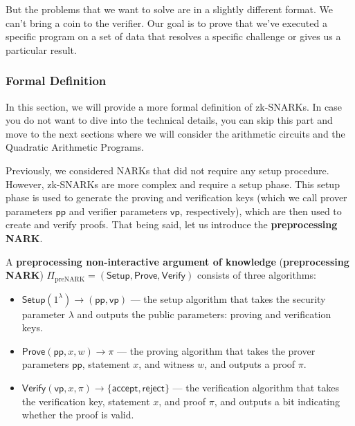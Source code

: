 \documentclass[../lecture-notes.tex]{subfiles}
\begin{document}
But the problems that we want to solve are in a slightly different format. We can't bring a coin to
the verifier. Our goal is to prove that we've executed a specific program on a set of data that 
resolves a specific challenge or gives us a particular result.

\subsubsection{Formal Definition}

In this section, we will provide a more formal definition of zk-SNARKs. In case you do not want to
dive into the technical details, you can skip this part and move to the next sections where we will
consider the arithmetic circuits and the Quadratic Arithmetic Programs.

Previously, we considered NARKs that did not require any setup procedure. However, zk-SNARKs are
more complex and require a setup phase. This setup phase is used to generate the proving and
verification keys (which we call prover parameters $\mathsf{pp}$ and verifier parameters $\mathsf{vp}$, respectively), 
which are then used to create and verify proofs. That being said, let us introduce the \textbf{preprocessing NARK}.

\begin{definition}
    A \textbf{preprocessing non-interactive argument of knowledge} (\textbf{preprocessing NARK}) $\Pi_{\text{preNARK}}=(\mathsf{Setup},\mathsf{Prove},\mathsf{Verify})$ consists of three algorithms:
    \begin{itemize}
        \item $\mathsf{Setup}(1^\lambda) \rightarrow (\mathsf{pp}, \mathsf{vp})$ --- the setup algorithm that takes the security parameter $\lambda$ and outputs the public parameters: proving and verification keys.
        \item $\mathsf{Prove}(\mathsf{pp}, x, w) \rightarrow \pi$ --- the proving algorithm that takes the prover parameters $\mathsf{pp}$, statement $x$, and witness $w$, and outputs a proof $\pi$.
        \item $\mathsf{Verify}(\mathsf{vp}, x, \pi) \rightarrow \{\mathsf{accept}, \mathsf{reject}\}$ --- the verification algorithm that takes the verification key, statement $x$, and proof $\pi$, and outputs a bit indicating whether the proof is valid.
    \end{itemize}
\end{definition}
\end{document}
